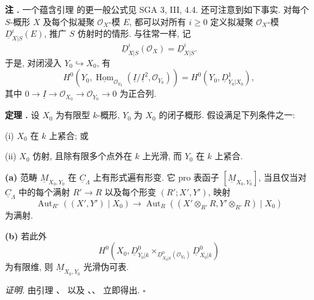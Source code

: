 
\medskip
\noindent\textbf{注 .}
一个蕴含引理  的更一般公式见 SGA 3, III, 4.4. 还可注意到如下事实. 对每个 $S$-概形 $X$ 及每个拟凝聚 $\mathcal O_X$-模 $E$, 都可以对所有 $i\geq0$ 定义拟凝聚 $\mathcal O_X$-模 $\underline D^i_{X|S}(E)$, 推广 $S$ 仿射时的情形. 与往常一样, 记
\[
\underline D^i_{X|S}(\mathcal O_X)=\underline D^i_{X|S}.
\]
于是, 对闭浸入 $Y_0\hookrightarrow X_0$, 有
\[
H^0\!\left(
Y_0,
\underline{\operatorname{Hom}}_{\mathcal O_{Y_0}}
(\underline I/\underline I^2,\mathcal O_{Y_0})
\right)
=H^0(Y_0,\underline D^1_{Y_0|X_0}),
\]
其中 $0\longrightarrow\underline I\longrightarrow\mathcal O_{X_0}
\longrightarrow\mathcal O_{Y_0}\longrightarrow0$ 为正合列.

\medskip
\noindent\textbf{定理 .}
设 $X_0$ 为有限型 $k$-概形, $Y_0$ 为 $X_0$ 的闭子概形. 假设满足下列条件之一:

\smallskip
\noindent(i) $X_0$ 在 $k$ 上紧合; 或

\noindent(ii) $X_0$ 仿射, 且除有限多个点外在 $k$ 上光滑, 而 $Y_0$ 在 $k$ 上紧合.

\smallskip
\noindent\textbf{(a)}
范畴 $\underline M_{X_0,Y_0}$ 在 $\underline C_\Lambda$ 上有形式遍有形变. 它 pro 表函子 $[\underline M_{X_0,Y_0}]$, 当且仅当对 $\underline C_\Lambda$ 中的每个满射 $R'\longrightarrow R$ 以及每个形变 $(R';X',Y')$, 映射
\[
\operatorname{Aut}_{R'}((X',Y')\mid X_0)
\longrightarrow
\operatorname{Aut}_{R}\!\left(
(X'\otimes_{R'}R,Y'\otimes_{R'}R)\mid X_0
\right)
\]
为满射.

\smallskip
\noindent\textbf{(b)}
若此外
\[
H^0\!\left(
X_0,
\underline D^0_{Y_0|k}
\times_{\underline D^0_{X_0|k}(\mathcal O_{Y_0})}
\underline D^0_{X_0|k}
\right)
\]
为有限维, 则 $\underline M_{X_0,Y_0}$ 光滑伪可表.

\medskip
\noindent\textit{证明.}
由引理 、 以及 、、 立即得出. \hfill$\square$



